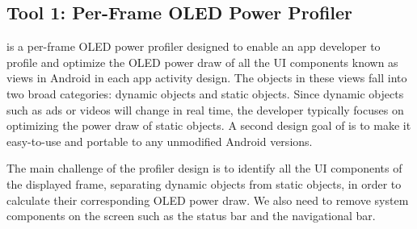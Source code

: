 \subsection{Tool 1: Per-Frame OLED Power Profiler}
\label{subsec:analyzer}

\appwithlink is a per-frame OLED power profiler designed to enable
an app developer to profile and optimize the OLED power draw of all the
UI components known as views in Android in each app activity design.
The objects in these views fall into two broad categories:
dynamic objects and static objects. Since dynamic objects such as ads or videos
will change in real time, the developer typically focuses on
optimizing the power draw of static objects.
A second design goal of \appwithlink is to make it easy-to-use and portable
to any unmodified Android versions.






The main challenge of the \appwithlink profiler design is to identify all the UI
components of the displayed frame, \eg separating dynamic objects from
static objects, in order to calculate their corresponding OLED power
draw.
% 
We also need to remove system components on the screen such as the
status bar and the navigational bar.


